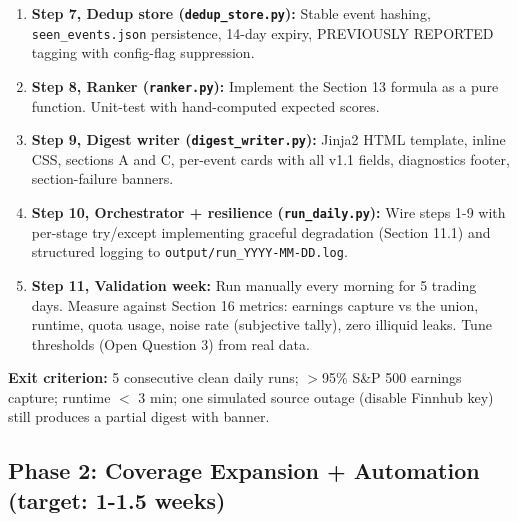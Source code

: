 \documentclass[11pt]{article}
\begin{document}
\begin{enumerate}
  \item \textbf{Step 7, Dedup store (\texttt{dedup\_store.py}):} Stable event hashing, \texttt{seen\_events.json} persistence, 14-day expiry, PREVIOUSLY REPORTED tagging with config-flag suppression.
  \item \textbf{Step 8, Ranker (\texttt{ranker.py}):} Implement the Section 13 formula as a pure function. Unit-test with hand-computed expected scores.
  \item \textbf{Step 9, Digest writer (\texttt{digest\_writer.py}):} Jinja2 HTML template, inline CSS, sections A and C, per-event cards with all v1.1 fields, diagnostics footer, section-failure banners.
  \item \textbf{Step 10, Orchestrator + resilience (\texttt{run\_daily.py}):} Wire steps 1-9 with per-stage try/except implementing graceful degradation (Section 11.1) and structured logging to \texttt{output/run\_YYYY-MM-DD.log}.
  \item \textbf{Step 11, Validation week:} Run manually every morning for 5 trading days. Measure against Section 16 metrics: earnings capture vs the union, runtime, quota usage, noise rate (subjective tally), zero illiquid leaks. Tune thresholds (Open Question 3) from real data.
\end{enumerate}
\textbf{Exit criterion:} 5 consecutive clean daily runs; $>$95\% S\&P 500 earnings capture; runtime $<$ 3 min; one simulated source outage (disable Finnhub key) still produces a partial digest with banner.

\subsection{Phase 2: Coverage Expansion + Automation \hfill {\small (target: 1-1.5 weeks)}}
\end{document}
